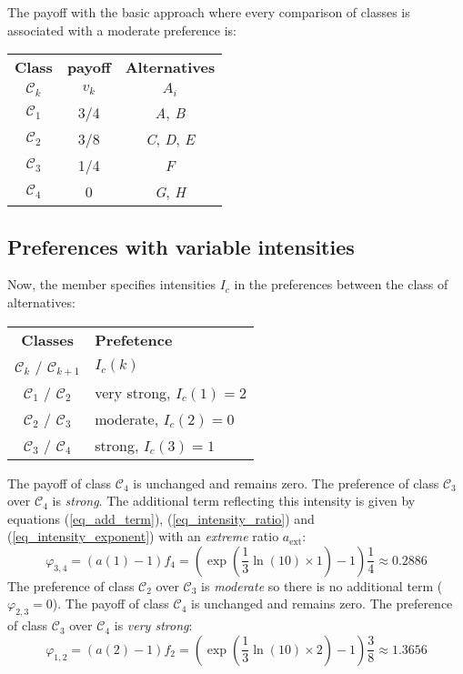 \documentclass[12pt,a4paper]{article}
\begin{document}
The payoff with the basic approach where every comparison of classes is associated with a moderate preference is:

\begin{table}[ht]
\centering
\begin{tabular}{|c|c|c|}
\hline
\textbf{Class}&\textbf{payoff} &\textbf{Alternatives}\\
$\mathcal{C}_k$ & $v_k$ & $A_i$ \\
\hline
$\mathcal{C}_1$ & 3/4  & \textit{A}, \textit{B} \\
$\mathcal{C}_2$ & 3/8  & \textit{C}, \textit{D}, \textit{E} \\
$\mathcal{C}_3$ & 1/4  & \textit{F} \\
$\mathcal{C}_4$ & 0  & \textit{G}, \textit{H} \\
\hline
\end{tabular}
\end{table}

\subsection{Preferences with variable intensities}

Now, the member specifies intensities $I_c$ in the preferences between the class of alternatives:

\begin{table}[ht]
\centering
\begin{tabular}{|c|l|}
\hline
\textbf{Classes}&\textbf{Prefetence}\\
$\mathcal{C}_k$ / $\mathcal{C}_{k+1}$ & $I_c(k)$ \\
\hline
$\mathcal{C}_1$ / $\mathcal{C}_2$ & very strong, $I_c(1)=2$ \\
$\mathcal{C}_2$ / $\mathcal{C}_3$ & moderate, $I_c(2)=0$ \\
$\mathcal{C}_3$ / $\mathcal{C}_4$ & strong, $I_c(3)=1$ \\
\hline
\end{tabular}
\end{table}

The payoff of class $\mathcal{C}_4$ is unchanged and remains zero. The preference of class $\mathcal{C}_3$ over $\mathcal{C}_4$ is \textsl{strong}. The additional term reflecting this intensity is given by equations (\ref{eq_add_term}), (\ref{eq_intensity_ratio}) and (\ref{eq_intensity_exponent}) with an \textsl{extreme} ratio $a_\mathrm{ext}$:
\begin{equation}
\varphi_{3,4} = \left(a\left(1\right)-1\right)f_4 = \left(\exp(\frac13\ln(10)\times1)-1\right)\frac14\approx0.2886
\end{equation}
The preference of class $\mathcal{C}_2$ over $\mathcal{C}_3$ is \textsl{moderate} so there is no additional term ($\varphi_{2,3}=0$).
The payoff of class $\mathcal{C}_4$ is unchanged and remains zero. The preference of class $\mathcal{C}_3$ over $\mathcal{C}_4$ is \textsl{very strong}:
\begin{equation}
\varphi_{1,2} = \left(a\left(2\right)-1\right)f_2 = \left(\exp(\frac13\ln(10)\times2)-1\right)\frac38\approx1.3656
\end{equation}
\end{document}
